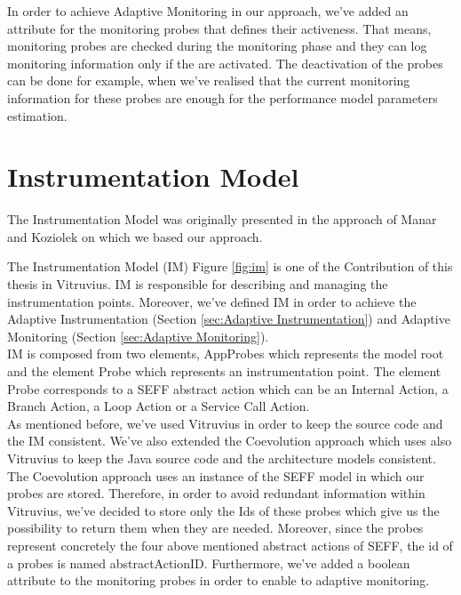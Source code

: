 In order to achieve Adaptive Monitoring in our approach, we’ve added an attribute for the monitoring probes that defines their activeness. That means, monitoring probes are checked during the monitoring phase and they can log monitoring information only if the are activated. The deactivation of the probes can be done for example, when we've realised that the current monitoring information for these probes are enough for the performance model parameters estimation.\\

\section{Instrumentation Model}
\label{sec:Instrumentation Model}
The Instrumentation Model was originally presented in the approach of Manar and Koziolek \cite{mazkatli2018continuous} on which we based our approach. 

The Instrumentation Model (IM) Figure \ref{fig:im} is one of the Contribution of this thesis in Vitruvius. IM is responsible for describing and managing the instrumentation points. Moreover, we've defined IM in order to achieve the Adaptive Instrumentation (Section \ref{sec:Adaptive Instrumentation}) and Adaptive Monitoring (Section \ref{sec:Adaptive Monitoring}).\\

IM is composed from two elements, AppProbes which represents the model root and the element Probe which represents an instrumentation point. The element Probe corresponds to a SEFF abstract action which can be an Internal Action, a Branch Action, a Loop Action or a Service Call Action.\\

As mentioned before, we’ve used Vitruvius in order to keep the source code and the IM consistent. We've also extended the Coevolution approach which uses also Vitruvius to keep the Java source code and the architecture models consistent. The Coevolution approach uses an instance of the SEFF model in which our probes are stored. Therefore, in order to avoid redundant information within Vitruvius, we've decided to store only the Ids of these probes which give us the possibility to return them when they are needed. Moreover, since the probes represent concretely the four above mentioned abstract actions of SEFF, the id of a probes is named abstractActionID. Furthermore, we've added a boolean attribute to the monitoring probes in order to enable to adaptive monitoring. \\

